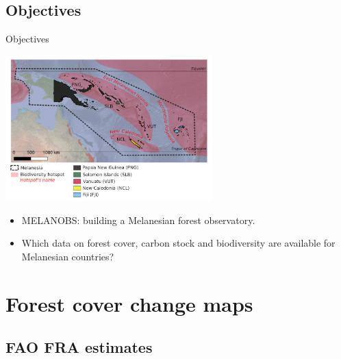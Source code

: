 \documentclass[10pt,table,dvipsnames,compress]{beamer}
\begin{document}
\subsection{Objectives}
\label{sec:org6327cca}

\begin{frame}[label={sec:orgd56687c}]{Objectives}
\begin{center}
\includegraphics[width=8cm]{figs/carte_melanobs.jpg}
\end{center}

\begin{itemize}
\item MELANOBS: building a Melanesian forest observatory.
\item Which data on forest cover, carbon stock and biodiversity are available for Melanesian countries?
\end{itemize}
\end{frame}

\section{Forest cover change maps}
\label{sec:orgfe3340d}

\subsection{FAO FRA estimates}
\label{sec:org0189183}
\end{document}
